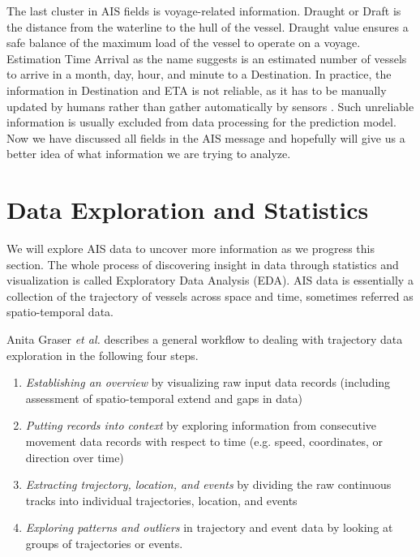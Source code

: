 The last cluster in AIS fields is voyage-related information. Draught or Draft is the distance from the waterline to the hull of the vessel. Draught value ensures a safe balance of the maximum load of the vessel to operate on a voyage. Estimation Time Arrival as the name suggests is an estimated number of vessels to arrive in a month, day, hour, and minute to a Destination. In practice, the information in Destination and ETA is not reliable, as it has to be manually updated by humans rather than gather automatically by sensors \cite{aivsprotocolraymond}. Such unreliable information is usually excluded from data processing for the prediction model. Now we have discussed all fields in the AIS message and hopefully will give us a better idea of what information we are trying to analyze.

\section{Data Exploration and Statistics}
We will explore AIS data to uncover more information as we progress this section. The whole process of discovering insight in data through statistics and visualization is called Exploratory Data Analysis (EDA). AIS data is essentially a collection of the trajectory of vessels across space and time, sometimes referred as spatio-temporal data.

Anita Graser \emph{et al.} \cite{graser2020open} describes a general workflow to dealing with trajectory data exploration in the following four steps.
\begin{enumerate}
    \item \emph{Establishing an overview} by visualizing raw input data records (including assessment of spatio-temporal extend and gaps in data)
    \item \emph{Putting records into context} by exploring information from consecutive movement data records with respect to time (e.g. speed, coordinates, or direction over time)
    \item \emph{Extracting trajectory, location, and events} by dividing the raw continuous tracks into individual trajectories, location, and events
    \item \emph{Exploring patterns and outliers} in trajectory and event data by looking at groups of trajectories or events.
\end{enumerate}

